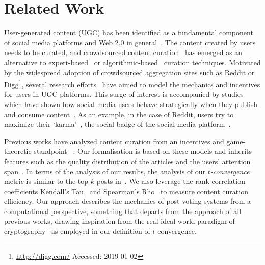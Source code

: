 \section{Related Work}
  User-generated content (UGC) has been identified as a fundamental component of
  social media platforms and Web 2.0 in general~\cite{kaplan2010users}. The
  content created by users needs to be curated, and crowdsourced content
  curation~\cite{askalidis2013theoretical} has emerged as an alternative to
  expert-based~\cite{stanoevska2012content} or
  algorithmic-based~\cite{rader2015understanding} curation techniques. Motivated
  by the widespread adoption of crowdsourced aggregation sites such as Reddit or
  Digg\footnote{\url{http://digg.com/} Accessed: 2019-01-02}, several research
  efforts~\cite{das2010ranking,ghosh2011incentivizing,abbassi2014distributed}
  have aimed to model the mechanics and incentives for users in UGC platforms.
  This surge of interest is accompanied by studies which have shown how social
  media users behave strategically when they publish and consume
  content~\cite{may2014filter}. As an example, in the case of Reddit, users try
  to maximize their `karma'~\cite{bergstrom2011don}, the social badge of the
  social media platform~\cite{anderson2013steering}.

  Previous works have analyzed content curation from an incentives and
  game-theoretic
  standpoint~\cite{ghosh2011incentivizing,das2010ranking,gupte2009news,may2014filter,abbassi2014distributed}
  . Our formalisation is based on these models and inherits features such as the
  quality distribution of the articles and the users' attention
  span~\cite{askalidis2013theoretical,ghosh2011incentivizing}. In terms of the
  analysis of our results, the analysis of our \textit{$t$-convergence} metric
  is similar to the top-$k$ posts in~\cite{askalidis2013theoretical}. We also
  leverage the rank correlation coefficients Kendall's
  Tau~\cite{kendall1955rank} and Spearman's Rho~\cite{spearman1904proof} to
  measure content curation efficiency. Our approach describes the mechanics of
  post-voting systems from a computational perspective, something that departs
  from the approach of all previous works, drawing inspiration from the
  real-ideal world paradigm of
  cryptography~\cite{goldreich1999foundations,lindell} as employed in our
  definition of $t$-convergence.

